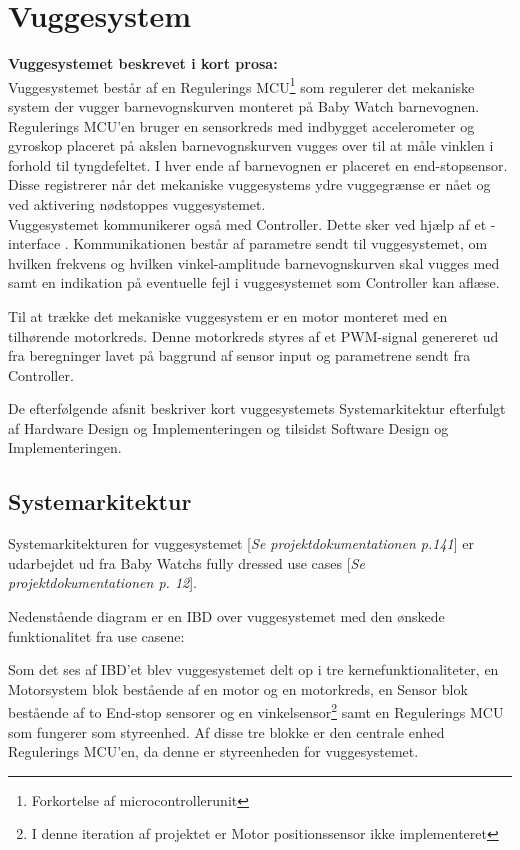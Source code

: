\chapter{Vuggesystem}
\label{vuggesys}
\textbf{Vuggesystemet beskrevet i kort prosa:} \\
Vuggesystemet består af en Regulerings MCU\footnote{Forkortelse af microcontrollerunit} som regulerer det mekaniske system der vugger barnevognskurven monteret på Baby Watch barnevognen. \\ Regulerings MCU'en bruger en sensorkreds med indbygget accelerometer og gyroskop placeret på akslen barnevognskurven vugges over til at måle vinklen i forhold til tyngdefeltet. I hver ende af barnevognen er placeret en end-stopsensor. Disse registrerer når det mekaniske vuggesystems ydre vuggegrænse er nået og ved aktivering nødstoppes vuggesystemet. \\ Vuggesystemet kommunikerer også med Controller. Dette sker ved hjælp af et \iic-interface \citep{I2C}. Kommunikationen består af parametre sendt til vuggesystemet, om hvilken frekvens og hvilken vinkel-amplitude barnevognskurven skal vugges med samt en indikation på eventuelle fejl i vuggesystemet som Controller kan aflæse.

Til at trække det mekaniske vuggesystem er en motor monteret med en tilhørende motorkreds. Denne motorkreds styres af et PWM-signal genereret ud fra beregninger lavet på baggrund af sensor input og parametrene sendt fra Controller.

De efterfølgende afsnit beskriver kort vuggesystemets Systemarkitektur efterfulgt af Hardware Design og Implementeringen og tilsidst Software Design og Implementeringen.
\newpage
\section{Systemarkitektur}
\label{vs_sysark}
Systemarkitekturen for vuggesystemet [\textit{Se projektdokumentationen p.141}] er udarbejdet ud fra Baby Watchs fully dressed use cases [\textit{Se projektdokumentationen p. 12}].

Nedenstående diagram er en IBD over vuggesystemet med den ønskede funktionalitet fra use casene:


Som det ses af IBD'et blev vuggesystemet delt op i tre kernefunktionaliteter, en Motorsystem blok bestående af en motor og en motorkreds, en Sensor blok bestående af to End-stop sensorer og en vinkelsensor\footnote{I denne iteration af projektet er Motor positionssensor ikke implementeret} samt en Regulerings MCU som fungerer som styreenhed. Af disse tre blokke er den centrale enhed Regulerings MCU'en, da denne er styreenheden for vuggesystemet.


